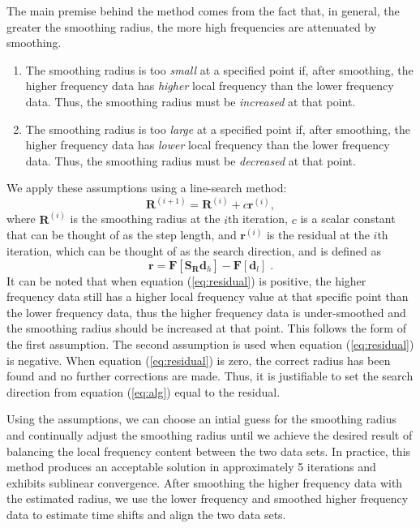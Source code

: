         The main premise behind the method comes from the fact that, in general, the greater the smoothing radius, the more high frequencies are attenuated by smoothing. 
        \begin{enumerate}
        \item The smoothing radius is too \emph{small} at a specified point if, after smoothing, the higher frequency data has \emph{higher} local frequency than the lower frequency data. Thus, the smoothing radius must be \emph{increased} at that point. 
        \item The smoothing radius is too \emph{large} at a specified point if, after smoothing, the higher frequency data has \emph{lower} local frequency than the lower frequency data. Thus, the smoothing radius must be \emph{decreased} at that point.
        \end{enumerate}
        We apply these assumptions using a line-search method:
                        \begin{equation}
                               \label{eq:alg}
                               \mathbf{R}^{(i+1)} = \mathbf{R}^{(i)}+ c \mathbf{r}^{(i)},
                        \end{equation}
        where $\mathbf{R}^{(i)}$ is the smoothing radius at the $i$th iteration, $c$ is a scalar constant that can be thought of as the step length, and $\mathbf{r}^{(i)}$ is the residual at the $i$th iteration, which can be thought of as the search direction, and is defined as
          \begin{equation}
                \label{eq:residual}
                \mathbf{r} = \mathbf{F}[\mathbf{S}_{\mathbf{R}} \mathbf{d}_h] - \mathbf{F}[\mathbf{d}_l]\;.
          \end{equation}
        It can be noted that when equation (\ref{eq:residual}) is positive, the higher frequency data still has a higher local frequency value at that specific point than the lower frequency data, thus the higher frequency data is under-smoothed and the smoothing radius should be increased at that point. This follows the form of the first assumption. 
        The second assumption is used when equation (\ref{eq:residual}) is negative. 
        When equation (\ref{eq:residual}) is zero, the correct radius has been found and no further corrections are made. 
        Thus, it is justifiable to set the search direction from equation (\ref{eq:alg}) equal to the residual.
        
        Using the assumptions, we can choose an intial guess for the smoothing radius and continually adjust the smoothing radius until we  achieve the desired result of balancing the local frequency content between the two data sets. 
        In practice, this method produces an acceptable solution in approximately 5 iterations and exhibits sublinear convergence. After smoothing the higher frequency data with the estimated radius, we use the lower frequency and smoothed higher frequency data to estimate time shifts and align the two data sets.
        
